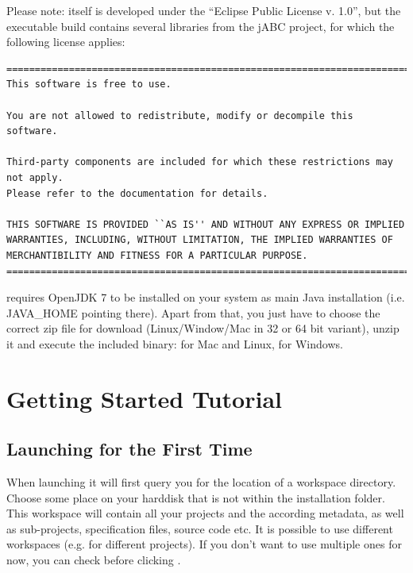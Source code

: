 \documentclass[a4paper,american,12pt]{scrreprt}
\begin{document}
Please note: \cinco{} itself is developed under the ``Eclipse Public License v. 1.0'', 
but the executable build contains several libraries from the jABC
project, for which the following license applies:

\begin{verbatim}
===============================================================================
This software is free to use.

You are not allowed to redistribute, modify or decompile this software.

Third-party components are included for which these restrictions may not apply.
Please refer to the documentation for details.

THIS SOFTWARE IS PROVIDED ``AS IS'' AND WITHOUT ANY EXPRESS OR IMPLIED
WARRANTIES, INCLUDING, WITHOUT LIMITATION, THE IMPLIED WARRANTIES OF
MERCHANTIBILITY AND FITNESS FOR A PARTICULAR PURPOSE.
===============================================================================
\end{verbatim}

\cinco{} requires OpenJDK 7 to be installed on your system as main Java
installation (i.e. JAVA\_HOME pointing there). Apart from that, you just have to
choose the correct zip file for download (Linux/Window/Mac in 32 or 64 bit
variant), unzip it and execute the included binary:  for Mac and
Linux,  for Windows.

\section{Getting Started Tutorial}

\subsection{Launching \cinco for the First Time}
\label{sec:firstLaunch}

When launching \cinco{} it will first query you for the location of a workspace
directory. Choose some place on your harddisk that is not within the \cinco
installation folder. This workspace will contain all your \cinco projects
and the according metadata, as well as sub-projects, specification files, source
code etc. It is possible to use different workspaces (e.g. for different
projects). If you don't want to use multiple ones for now, you can check
 before clicking .
\end{document}
